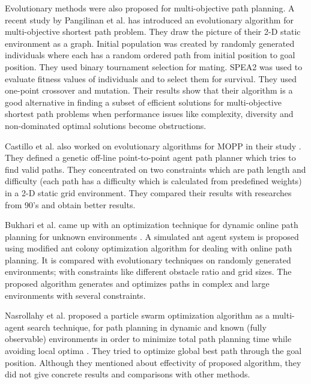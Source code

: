 \documentclass[10pt,journal]{IEEEtran}
\begin{document}
Evolutionary methods were also proposed for multi-objective path planning. A recent study by Pangilinan et al. \cite{Pangilinan} has introduced an evolutionary algorithm for multi-objective shortest path problem. They draw the picture of their 2-D static environment as a graph. Initial population was created by randomly generated individuals where each has a random ordered path from initial position to goal position. They used binary tournament selection for mating. SPEA2 was used to evaluate fitness values of individuals and to select them for survival. They used one-point crossover and mutation. Their results show that their algorithm is a good alternative in finding a subset of efficient solutions for multi-objective shortest path problems when performance issues like complexity, diversity and non-dominated optimal solutions become obstructions.

Castillo et al. also worked on evolutionary algorithms for MOPP in their study \cite{Castillo:2007}. They defined a genetic off-line point-to-point agent path planner which tries to find valid paths. They concentrated on two constraints which are path length and difficulty (each path has a difficulty which is calculated from predefined weights) in a 2-D static grid environment. They compared their results with researches from 90's and obtain better results.

Bukhari et al. came up with an optimization technique for dynamic online path planning for unknown environments \cite{Bukhari:2010}. A simulated ant agent system is proposed using modified ant colony optimization algorithm for dealing with online path planning. It is compared with evolutionary techniques on randomly generated environments; with constraints like different obstacle ratio and grid sizes. The proposed algorithm generates and optimizes paths in complex and large environments with several constraints.

Nasrollahy et al. proposed a particle swarm optimization algorithm as a multi-agent search technique, for path planning in dynamic and known (fully observable) environments in order to minimize total path planning time while avoiding local optima \cite{Nasrollahy:2009}.
They tried to optimize global best path through the goal position. Although they mentioned about effectivity of proposed algorithm, they did not give concrete results and comparisons with other methods.

\end{document}
